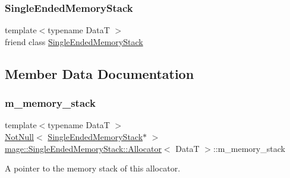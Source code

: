 \subsubsection{\texorpdfstring{Single\+Ended\+Memory\+Stack}{SingleEndedMemoryStack}}
{\footnotesize\ttfamily template$<$typename DataT $>$ \\
friend class \hyperlink{classmage_1_1_single_ended_memory_stack}{Single\+Ended\+Memory\+Stack}\hspace{0.3cm}{\ttfamily [friend]}}



\subsection{Member Data Documentation}
\hypertarget{classmage_1_1_single_ended_memory_stack_1_1_allocator_a23af772fad1588e6b4ead9c48bab36e2}{}\label{classmage_1_1_single_ended_memory_stack_1_1_allocator_a23af772fad1588e6b4ead9c48bab36e2} 
\subsubsection{\texorpdfstring{m\+\_\+memory\+\_\+stack}{m\_memory\_stack}}
{\footnotesize\ttfamily template$<$typename DataT $>$ \\
\hyperlink{namespacemage_a8769f9d670d6b585ea306cb1062af94b}{Not\+Null}$<$ \hyperlink{classmage_1_1_single_ended_memory_stack}{Single\+Ended\+Memory\+Stack}$\ast$ $>$ \hyperlink{classmage_1_1_single_ended_memory_stack_1_1_allocator}{mage\+::\+Single\+Ended\+Memory\+Stack\+::\+Allocator}$<$ DataT $>$\+::m\+\_\+memory\+\_\+stack\hspace{0.3cm}{\ttfamily [private]}}

A pointer to the memory stack of this allocator. 